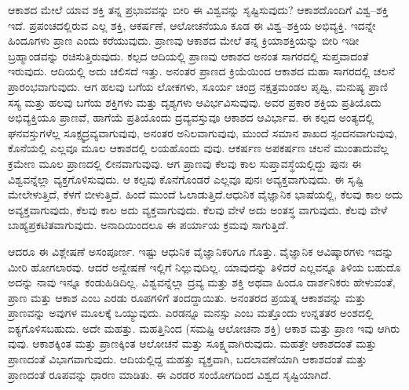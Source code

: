 ಆಕಾಶದ ಮೇಲೆ ಯಾವ ಶಕ್ತಿ ತನ್ನ ಪ್ರಭಾವವನ್ನು ಬೀರಿ ಈ ವಿಶ್ವವನ್ನು ಸೃಷ್ಟಿಸುವುದು? ಆಕಾಶದೊಂದಿಗೆ ವಿಶ್ವ–ಶಕ್ತಿ ಇದೆ. ಪ್ರಪಂಚದಲ್ಲಿರುವ ಎಲ್ಲ ಶಕ್ತಿ, ಆಕರ್ಷಣೆ, ಆಲೋಚನೆಯೂ ಕೂಡ ಈ ವಿಶ್ವ–ಶಕ್ತಿಯ ಅಭಿವ್ಯಕ್ತಿ. ಇದನ್ನೇ ಹಿಂದೂಗಳು ಪ್ರಾಣ ಎಂದು ಕರೆಯುವುದು. ಪ್ರಾಣವು ಆಕಾಶದ ಮೇಲೆ ತನ್ನ ಕ್ರಿಯಾಶಕ್ತಿಯನ್ನು ಬೀರಿ ಇಡೀ ಬ್ರಹ್ಮಾಂಡವನ್ನು ರಚಿಸುತ್ತಿರುವುದು. ಕಲ್ಪದ ಆದಿಯಲ್ಲಿ ಪ್ರಾಣವು ಆಕಾಶದ ಅನಂತ ಸಾಗರದಲ್ಲಿ ಸುಪ್ತವಾದಂತೆ ಇರುವುದು. ಆದಿಯಲ್ಲಿ ಅದು ಚಲಿಸದೆ ಇತ್ತು. ಅನಂತರ ಪ್ರಾಣದ ಕ್ರಿಯೆಯಿಂದ ಆಕಾಶದ ಮಹಾ ಸಾಗರದಲ್ಲಿ ಚಲನೆ ಪ್ರಾರಂಭವಾಗುವುದು. ಆಗ ಹಲವು ಬಗೆಯ ಲೋಕಗಳು, ಸೂರ್ಯ ಚಂದ್ರ ನಕ್ಷತ್ರಮಂಡಲ ಪೃಥ್ವಿ, ಮನುಷ್ಯ ಪ್ರಾಣಿ ಸಸ್ಯ ಮತ್ತು ಹಲವು ಬಗೆಯ ಶಕ್ತಿಗಳು ಮತ್ತು ದೃಶ್ಯಗಳು ಆವಿರ್ಭವಿಸುವುವು. ಅವರ ಪ್ರಕಾರ ಶಕ್ತಿಯ ಪ್ರತಿಯೊದು ಅಭಿವ್ಯಕ್ತಿಯೂ ಪ್ರಾಣವೆ, ಹಾಗೆಯೆ ಪ್ರತಿಯೊಂದು ದ್ರವ್ಯವಸ್ತುವೂ ಆಕಾಶದ ಆವಿರ್ಭಾವ. ಈ ಕಲ್ಪದ ಅಂತ್ಯದಲ್ಲಿ ಘನವಸ್ತುಗಳೆಲ್ಲ ಸೂಕ್ಷ್ಮದ್ರವ್ಯವಾಗುವುವು, ಅನಂತರ ಅನಿಲವಾಗುವುವು, ಮುಂದೆ ಸಮಾನ ಶಾಖದ ಸ್ಪಂದನವಾಗುವುವು, ಕೊನೆಯಲ್ಲಿ ಎಲ್ಲವೂ ಮೂಲ ಆಕಾಶದಲ್ಲಿ ಲಯಹೊಂದು ವುವು. ಆಕರ್ಷಣ ಅಪಕರ್ಷಣ ಚಲನೆ ಮುಂತಾದುವೆಲ್ಲ ಕ್ರಮೇಣ ಮೂಲ ಪ್ರಾಣದಲ್ಲಿ ಲೀನವಾಗುವುವು. ಆಗ ಪ್ರಾಣವು ಕೆಲವು ಕಾಲ ಸುಪ್ತಾವಸ್ಥೆಯಲ್ಲಿದ್ದು ಪುನಃ ಈ ವಿಶ್ವವನ್ನೆಲ್ಲಾ ವ್ಯಕ್ತಗೊಳಿಸುವುದು. ಆ ಕಲ್ಪವು ಕೊನೆಗೊಂಡರೆ ಎಲ್ಲವೂ ಪುನಃ ಅವ್ಯಕ್ತವಾಗುವುದು. ಈ ಸೃಷ್ಟಿ ಮೇಲೇಳುತ್ತಿದೆ, ಕೆಳಗೆ ಬೀಳುತ್ತಿದೆ. ಹಿಂದೆ ಮುಂದೆ ಓಲಾಡುತ್ತಿದೆ.ಆಧುನಿಕ ವೈಜ್ಞಾನಿಕ ಭಾಷೆಯಲ್ಲಿ, ಕೆಲವು ಕಾಲ ಅದು ಅವ್ಯಕ್ತವಾಗುವುದು, ಕೆಲವು ಕಾಲ ಅದು ವ್ಯಕ್ತವಾಗುವುದು. ಕೆಲವು ವೇಳೆ ಅದು ಅಂತಸ್ಥ ವಾಗುವುದು. ಕೆಲವು ವೇಳೆ ಬಾಹ್ಯಪ್ರಕಟಿತವಾಗುವುದು. ಅನಾದಿಯಿಂದಲೂ ಈ ಪರ್ಯಾಯ ಕ್ರಮವು ಸಾಗುತ್ತಿದೆ.

ಆದರೂ ಈ ವಿಶ್ಲೇಷಣೆ ಅಸಂಪೂರ್ಣ. ಇಷ್ಟು ಆಧುನಿಕ ವೈಜ್ಞಾನಿಕರಿಗೂ ಗೊತ್ತು. ವೈಜ್ಞಾನಿಕ ಆವಿಷ್ಕಾರಗಳು ಇದನ್ನು ಮೀರಿ ಹೋಗಲಾರವು. ಆದರೆ ಅನ್ವೇಷಣೆ ಇಲ್ಲಿಗೆ ನಿಲ್ಲುವುದಿಲ್ಲ. ಯಾವುದನ್ನು ತಿಳಿದರೆ ಎಲ್ಲವನ್ನೂ ತಿಳಿಯ ಬಹುದೊ ಅದನ್ನು ನಾವು ಇನ್ನೂ ಕಂಡುಹಿಡಿದಿಲ್ಲ. ವಿಶ್ವವನ್ನೆಲ್ಲಾ ದ್ರವ್ಯ ಮತ್ತು ಶಕ್ತಿ ಅಥವಾ ಹಿಂದೂ ದಾರ್ಶನಿಕರು ಹೇಳುವಂತೆ, ಪ್ರಾಣ ಮತ್ತು ಆಕಾಶ ಎಂಬ ಎರಡು ರೂಪಗಳಿಗೆ ತಂದದ್ದಾಯಿತು. ಅನಂತರದ ಪ್ರಯತ್ನ ಆಕಾಶವನ್ನು ಮತ್ತು ಪ್ರಾಣವನ್ನು ಅವುಗಳ ಮೂಲಕ್ಕೆ ಒಯ್ಯುವುದು. ಎರಡನ್ನೂ ಮನಸ್ಸು ಎಂಬ ಮತ್ತೊಂದು ಉನ್ನತತರ ಅಂಶದಲ್ಲಿ ಐಕ್ಯಗೊಳಿಸಬಹುದು. ಅದೇ ಮಹತ್ತು. ಮಹತ್ತಿನಿಂದ (ಸಮಷ್ಟಿ ಆಲೋಚನಾ ಶಕ್ತಿ) ಆಕಾಶ ಮತ್ತು ಪ್ರಾಣ ಇವು ಆಗಿರು ವುವು. ಆಕಾಶಕ್ಕಿಂತ ಮತ್ತು ಪ್ರಾಣಕ್ಕಿಂತ ಆಲೋಚನೆ ಮತ್ತು ಸೂಕ್ಷ್ಮವಾಗಿರುವುದು. ಮಹತ್ತೇ ಆಕಾಶದಂತೆ ಮತ್ತು ಪ್ರಾಣದಂತೆ ವಿಭಾಗವಾಗುವುದು. ಆದಿಯಲ್ಲಿದ್ದ ಮಹತ್ತು ವ್ಯಕ್ತವಾಗಿ, ಬದಲಾವಣೆಯಾಗಿ ಆಕಾಶದಂತೆ ಮತ್ತು ಪ್ರಾಣದಂತೆ ರೂಪವನ್ನು ಧಾರಣ ಮಾಡಿತು. ಈ ಎರಡರ ಸಂಯೋಗದಿಂದ ವಿಶ್ವದ ಸೃಷ್ಟಿಯಾಗಿದೆ.

